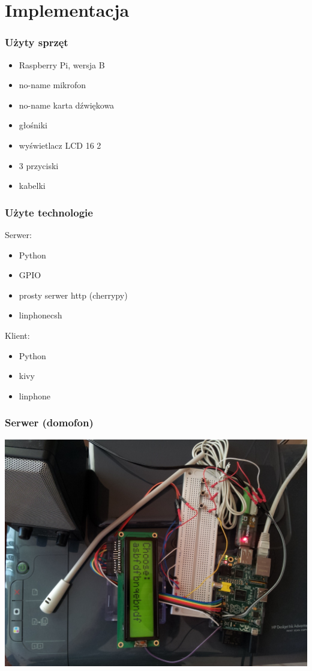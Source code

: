 \documentclass[presentation, 10pt]{beamer}
\begin{document}
\section{Implementacja}
\label{sec-3}
\begin{frame}
\frametitle{Użyty sprzęt}
\label{sec-3-1}

\begin{itemize}
\item Raspberry Pi, wersja B
\item no-name mikrofon
\item no-name karta dźwiękowa
\item głośniki
\item wyświetlacz LCD 16 \texttimes{} 2
\item 3 przyciski
\item kabelki
\end{itemize}
\end{frame}
\begin{frame}
\frametitle{Użyte technologie}
\label{sec-3-2}

Serwer:
\begin{itemize}
\item Python
\item GPIO
\item prosty serwer http (cherrypy)
\item linphonecsh
\end{itemize}

Klient:
\begin{itemize}
\item Python
\item kivy
\item linphone
\end{itemize}
\end{frame}
\begin{frame}
\frametitle{Serwer (domofon)}
\label{sec-3-3}

\includegraphics[width=.9\linewidth]{rpi1.jpg}
\end{frame}
\end{document}
